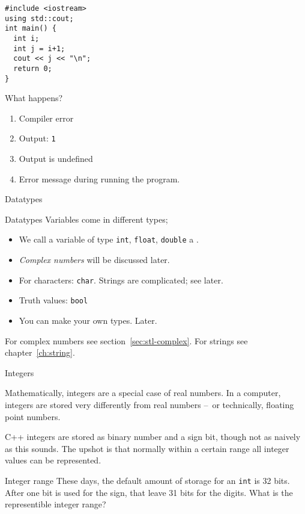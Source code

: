 \begin{exercise}
  \label{q:initvar}
\begin{lstlisting}
#include <iostream>
using std::cout;
int main() {
  int i;
  int j = i+1;
  cout << j << "\n";
  return 0;
}
\end{lstlisting}
What happens?
\begin{enumerate}
\item Compiler error
\item Output: \lstinline{1}
\item Output is undefined
\item Error message during running the program.
\end{enumerate}
\end{exercise}

 {Datatypes}
\label{sec:ctypes}

\begin{block}{Datatypes}
  \label{sl:datatypes}
  Variables come in different types;
  \begin{itemize}
  \item We call a variable of type
    \lstinline{int}, \lstinline{float}, \lstinline{double} a .
  \item \emph{Complex numbers} will be
    discussed later.
  \item 
    For characters: \lstinline{char}. Strings are complicated; see later.
  \item Truth values: \lstinline{bool}
  \item 
    You can make your own types. Later.
  \end{itemize}
\end{block}

For complex numbers see section~\ref{sec:stl-complex}.
For strings see chapter~\ref{ch:string}.

 {Integers}

Mathematically, integers are a special case of real numbers.
In a computer, integers are stored very differently from
real numbers --~or technically, floating point numbers.

C++ integers are stored as binary number and a sign bit, though not as
naively as this sounds. The upshot is that normally
within a certain range all integer values can be represented.

\begin{exercise}{Integer range}
  \label{ex:int-range}
  These days, the default amount of storage for an \lstinline{int} is
  32 bits. After one bit is used for the sign, that leave 31 bits for
  the digits. What is the representible integer range?
\end{exercise}

